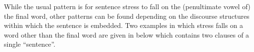 While the usual pattern is for sentence stress to fall
on the (penultimate vowel of) the final word,
other patterns can be found depending on the discourse
structures within which the sentence is embedded.
Two examples in which stress falls on a word other than
the final word are given in  below
which contains two clauses of a single ``sentence''.

\begin{exe}
\let\eachwordone=\textnormal \let\eachwordtwo=\ve
	\ex{\begin{xlist}
		\ex{\glll	[haj ʔimɐ ˈmn\tbr{a}ɔ miʔkɔ kuɐn]\\
					\hp{[}hai ima m-n\tbr{a}o mi-ʔko kuan,	\\
					\hp{[}{\hai} {\ima} \m-go \mi-{\qko} village \\
				\glt	\lh{[}`We left the village,
							\txrf{130920-1, 0.40} {\emb{130920-1-00-40.mp3}{\spk{}}{\apl}}}
		\ex{\glll	[ˈʔ\tbr{ɛ}ːs nɛɐn mɛsɛʔ kʲikʊ]\\
						\hp{[}\tbr{e}es nean mese-ʔ kiku.\\
						\hp{[}{\esc} day{\M} one-{\qnum} early.morning\\
				\glt	\lh{[}it was (on) Monday morning.'}
		\end{xlist}}\label{ex:130920-1, 0.40 ch:ph}
\end{exe}